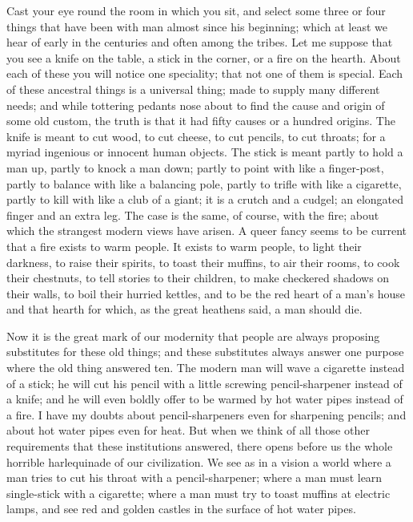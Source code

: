 \documentclass[final,10pt,letterpaper,twocolumn,openany]{book}
\begin{document}
    Cast your eye round the room in which you sit, and select some three
or four things that have been with man almost since his beginning; which
at least we hear of early in the centuries and often among the tribes. Let
me suppose that you see a knife on the table, a stick in the corner, or a fire
on the hearth. About each of these you will notice one speciality; that not
one of them is special. Each of these ancestral things is a universal thing;
made to supply many different needs; and while tottering pedants nose
about to find the cause and origin of some old custom, the truth is that it
had fifty causes or a hundred origins. The knife is meant to cut wood, to
cut cheese, to cut pencils, to cut throats; for a myriad ingenious or
innocent human objects. The stick is meant partly to hold a man up, partly
to knock a man down; partly to point with like a finger-post, partly to
balance with like a balancing pole, partly to trifle with like a cigarette,
partly to kill with like a club of a giant; it is a crutch and a cudgel; an
elongated finger and an extra leg. The case is the same, of course, with the
fire; about which the strangest modern views have arisen. A queer fancy
seems to be current that a fire exists to warm people. It exists to warm
people, to light their darkness, to raise their spirits, to toast their muffins,
to air their rooms, to cook their chestnuts, to tell stories to their children,
to make checkered shadows on their walls, to boil their hurried kettles, and
to be the red heart of a man's house and that hearth for which, as the great
heathens said, a man should die.

Now it is the great mark of our modernity that people are always
proposing substitutes for these old things; and these substitutes always
answer one purpose where the old thing answered ten. The modern man
will wave a cigarette instead of a stick; he will cut his pencil with a little
screwing pencil-sharpener instead of a knife; and he will even boldly offer
to be warmed by hot water pipes instead of a fire. I have my doubts about
pencil-sharpeners even for sharpening pencils; and about hot water pipes
even for heat. But when we think of all those other requirements that these
institutions answered, there opens before us the whole horrible
harlequinade of our civilization. We see as in a vision a world where a
man tries to cut his throat with a pencil-sharpener; where a man must learn
single-stick with a cigarette; where a man must try to toast muffins at
electric lamps, and see red and golden castles in the surface of hot water
pipes.
\end{document}
